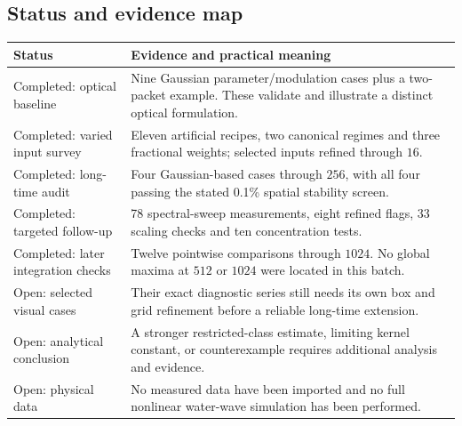 \documentclass[10pt,letterpaper]{article}
\numberwithin{equation}{section}
\begin{document}
\subsection{Status and evidence map}\label{restart}
\begin{center}\begin{tabular}{p{.27\linewidth}p{.64\linewidth}}\toprule
Status & Evidence and practical meaning\\\midrule
Completed: optical baseline & Nine Gaussian parameter/modulation cases plus a
two-packet example. These validate and illustrate a distinct optical formulation.\\
Completed: varied input survey & Eleven artificial recipes, two canonical regimes
and three fractional weights; selected inputs refined through $16$.\\
Completed: long-time audit & Four Gaussian-based cases through $256$, with all
four passing the stated 0.1\% spatial stability screen.\\
Completed: targeted follow-up & 78 spectral-sweep measurements, eight refined flags,
33 scaling checks and ten concentration tests.\\
Completed: later integration checks & Twelve pointwise comparisons through $1024$.
No global maxima at $512$ or $1024$ were located in this batch.\\
Open: selected visual cases & Their exact diagnostic series still needs its own
box and grid refinement before a reliable long-time extension.\\
Open: analytical conclusion & A stronger restricted-class estimate, limiting kernel
constant, or counterexample requires additional analysis and evidence.\\
Open: physical data & No measured data have been imported and no full nonlinear
water-wave simulation has been performed.\\\bottomrule
\end{tabular}\end{center}
\end{document}
